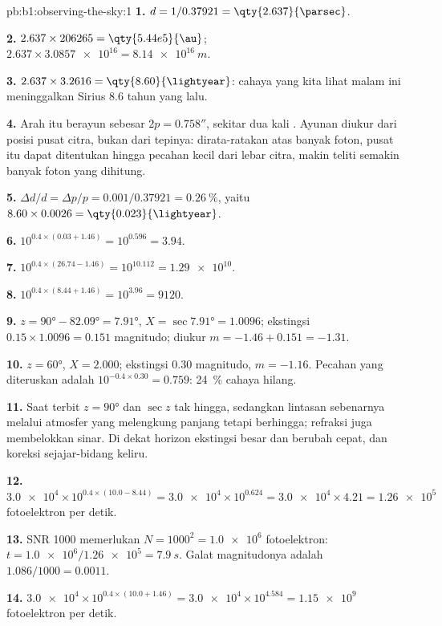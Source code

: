 \begin{solution}{pb:b1:observing-the-sky:1}
\textbf{1.} $d = 1/0.37921 = \qty{2.637}{\parsec}$.

\textbf{2.} $2.637\times206265 = \qty{5.44e5}{\au}$;
$2.637\times\num{3.0857e16} = \qty{8.14e16}{m}$.

\textbf{3.} $2.637\times3.2616 = \qty{8.60}{\lightyear}$: cahaya yang kita lihat malam ini meninggalkan Sirius 8.6 tahun yang lalu.

\textbf{4.} Arah itu berayun sebesar $2p = \ang{;;0.758}$, sekitar dua kali . Ayunan diukur dari posisi pusat citra, bukan dari tepinya: dirata-ratakan atas banyak foton, pusat itu dapat ditentukan hingga pecahan kecil dari lebar citra, makin teliti semakin banyak foton yang dihitung.

\textbf{5.} $\Delta d/d = \Delta p/p = 0.001/0.37921 = \qty{0.26}{\percent}$,
yaitu $8.60\times0.0026 = \qty{0.023}{\lightyear}$.

\textbf{6.} $10^{0.4\times(0.03 + 1.46)} = 10^{0.596} = 3.94$.

\textbf{7.} $10^{0.4\times(26.74 - 1.46)} = 10^{10.112} = \num{1.29e10}$.

\textbf{8.} $10^{0.4\times(8.44 + 1.46)} = 10^{3.96} = \num{9120}$.

\textbf{9.} $z = \ang{90} - \ang{82.09} = \ang{7.91}$, $X = \sec\ang{7.91} =
1.0096$; ekstingsi $0.15\times1.0096 = 0.151$ magnitudo; diukur
$m = -1.46 + 0.151 = -1.31$.

\textbf{10.} $z = \ang{60}$, $X = 2.000$; ekstingsi 0.30 magnitudo,
$m = -1.16$. Pecahan yang diteruskan adalah $10^{-0.4\times0.30} = 0.759$:
\qty{24}{\percent} cahaya hilang.

\textbf{11.} Saat terbit $z = \ang{90}$ dan $\sec z$ tak hingga, sedangkan
lintasan sebenarnya melalui atmosfer yang melengkung panjang tetapi berhingga; refraksi juga membelokkan sinar. Di dekat horizon ekstingsi besar dan berubah cepat, dan koreksi sejajar-bidang keliru.

\textbf{12.} $\num{3.0e4}\times10^{0.4\times(10.0 - 8.44)} = \num{3.0e4}
\times10^{0.624} = \num{3.0e4}\times4.21 = \num{1.26e5}$ fotoelektron per
detik.

\textbf{13.} SNR 1000 memerlukan $N = 1000^2 = \num{1.0e6}$
fotoelektron: $t = \num{1.0e6}/\num{1.26e5} = \qty{7.9}{s}$. Galat magnitudonya
adalah $1.086/1000 = \num{0.0011}$.

\textbf{14.} $\num{3.0e4}\times10^{0.4\times(10.0 + 1.46)} = \num{3.0e4}
\times10^{4.584} = \num{1.15e9}$ fotoelektron per detik.


\end{solution}

